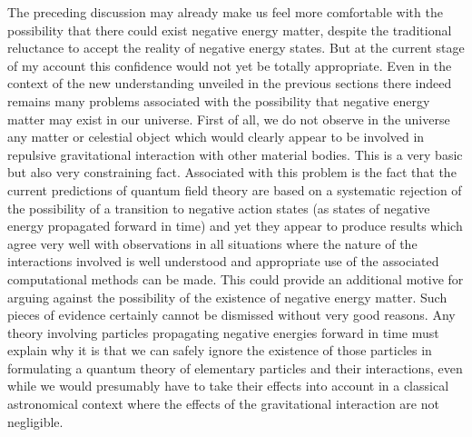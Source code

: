 \documentclass[notitlepage,12pt]{report}
\begin{document}
The preceding discussion may already make us feel more comfortable with the possibility that there could exist negative energy matter, despite the traditional reluctance to accept the reality of negative energy states. But at the current stage of my account this confidence would not yet be totally appropriate. Even in the context of the new understanding unveiled in the previous sections there indeed remains many problems associated with the possibility that negative energy matter may exist in our universe. First of all, we do not observe in the universe any matter or celestial object which would clearly appear to be involved in repulsive gravitational interaction with other material bodies. This is a very basic but also very constraining fact. Associated with this problem is the fact that the current predictions of quantum field theory are based on a systematic rejection of the possibility of a transition to negative action states (as states of negative energy propagated forward in time) and yet they appear to produce results which agree very well with observations in all situations where the nature of the interactions involved is well understood and appropriate use of the associated computational methods can be made. This could provide an additional motive for arguing against the possibility of the existence of negative energy matter. Such pieces of evidence certainly cannot be dismissed without very good reasons. Any theory involving particles propagating negative energies forward in time must explain why it is that we can safely ignore the existence of those particles in formulating a quantum theory of elementary particles and their interactions, even while we would presumably have to take their effects into account in a classical astronomical context where the effects of the gravitational interaction are not negligible.
\end{document}
